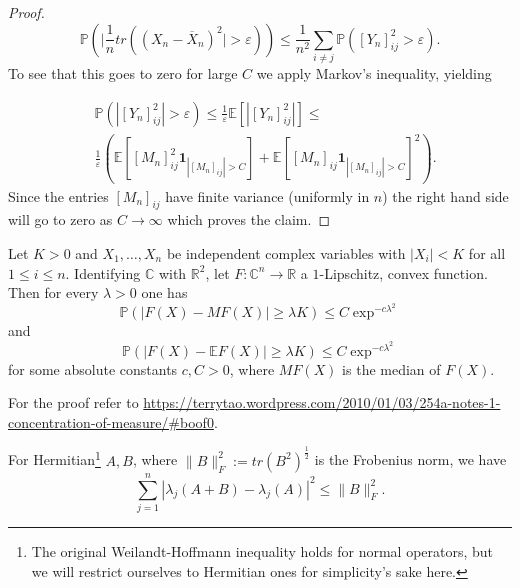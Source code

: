 \begin{proof}
	$$
	\mathbb P\left(|\frac{1}{n}tr\left((X_n-\overline X_n)^2|>\varepsilon\right)\right)\leq
	\frac{1}{n^2}\sum_{i\neq j}\mathbb P\left([Y_n]_{ij}^2>\varepsilon\right).
	$$
	To see that this goes to zero for large $C$ we apply Markov's inequality, yielding 
	
	\begin{align*}
		&\mathbb P(|[Y_n]_{ij}^2|>\varepsilon)\leq
	\frac{1}{\varepsilon}\mathbb E\left[|[Y_n]_{ij}^2|\right]\leq\\
	&\frac{1}{\varepsilon}\left(\mathbb E[[M_n]_{ij}^2\mathbf 1_{|[M_n]_{ij}|>C}]+\mathbb E[[M_n]_{ij}\mathbf 1_{|[M_n]_{ij}|>C}]^2\right).
	\end{align*}
	Since the entries $[M_n]_{ij}$ have finite variance (uniformly in $n$) the right hand side will go to zero as $C\rightarrow\infty$ which proves the claim.
\end{proof}

\begin{theorem}
	Let $K>0$ and $X_1,\dots,X_n$ be independent complex variables with $|X_i|<K$ for all $1\leq i\leq n$. Identifying $\mathbb C$ with $\mathbb R^2$, let $F:\mathbb C^n\rightarrow\mathbb R$ a $1$-Lipschitz, convex function. Then for every $\lambda>0$ one has
	$$\mathbb P(|F(X)-MF(X)|\geq \lambda K)\leq C\exp^{-c\lambda^2}$$ and $$\mathbb P(|F(X)-\mathbb EF(X)|\geq \lambda K)\leq C\exp^{-c\lambda^2}$$
	for some absolute constants $c,C>0$, where $MF(X)$ is the median of $F(X)$.
\end{theorem}
For the proof refer to \url{https://terrytao.wordpress.com/2010/01/03/254a-notes-1-concentration-of-measure/#boof0}.

\begin{theorem}\label{thm:weilandthoffmann}
	For Hermitian\footnote{The original Weilandt-Hoffmann inequality holds for normal operators, but we will restrict ourselves to Hermitian ones for simplicity's sake here.} $A,B$, where $\|B\|_F^2:=tr(B^2)^{\frac{1}{2}}$ is the Frobenius norm, we have
	$$\sum_{j=1}^n|\lambda_j(A+B)-\lambda_j(A)|^2\leq\|B\|_F^2.$$
\end{theorem}

